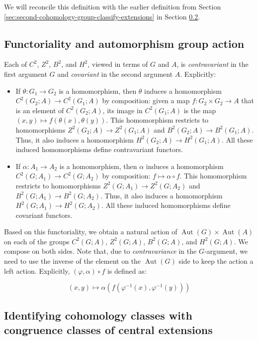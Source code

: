 \documentclass{ucetd}
\begin{document}
We will reconcile this definition
with the earlier definition from Section \ref{sec:second-cohomology-group-classify-extensions} in Section \ref{sec:explicit-cocycle-description-of-extension}.

\subsection{Functoriality and automorphism group action}

Each of $C^2$, $Z^2$, $B^2$, and $H^2$, viewed in terms of $G$ and
$A$, is {\em contravariant} in the first argument $G$ and {\em
  covariant} in the second argument $A$. Explicitly:

\begin{itemize}
\item If $\theta:G_1 \to G_2$ is a homomorphism, then $\theta$ induces
  a homomorphism $C^2(G_2;A) \to C^2(G_1;A)$ by composition: given a
  map $f:G_2 \times G_2 \to A$ that is an element of $C^2(G_2;A)$, its
  image in $C^2(G_1;A)$ is the map $(x,y) \mapsto
  f(\theta(x),\theta(y))$. This homomorphism restricts to
  homomorphisms $Z^2(G_2;A) \to Z^2(G_1;A)$ and $B^2(G_2;A) \to
  B^2(G_1;A)$. Thus, it also induces a homomorphism $H^2(G_2;A) \to
  H^2(G_1;A)$. All these induced homomorphisms define contravariant
  functors.
\item If $\alpha:A_1 \to A_2$ is a homomorphism, then $\alpha$ induces
  a homomorphism $C^2(G;A_1) \to C^2(G;A_2)$ by composition: $f
  \mapsto \alpha \circ f$. This homomorphism restricts to
  homomorphisms $Z^2(G;A_1) \to Z^2(G;A_2)$ and $B^2(G;A_1) \to
  B^2(G;A_2)$. Thus, it also induces a homomorphism $H^2(G;A_1) \to
  H^2(G;A_2)$. All these induced homomorphisms define covariant
  functors.
\end{itemize}

Based on this functoriality, we obtain a natural action of
$\operatorname{Aut}(G) \times \operatorname{Aut}(A)$ on each of the
groups $C^2(G;A)$, $Z^2(G;A)$, $B^2(G;A)$, and $H^2(G;A)$. We compose
on both sides. Note that, due to {\em contravariance} in the
$G$-argument, we need to use the inverse of the element on the
$\operatorname{Aut}(G)$ side to keep the action a left
action. Explicitly, $(\varphi,\alpha) \circ f$ is defined as:

$$(x,y) \mapsto \alpha(f(\varphi^{-1}(x),\varphi^{-1}(y)))$$

\subsection{Identifying cohomology classes with congruence classes of central extensions}\label{sec:explicit-cocycle-description-of-extension}
\end{document}
